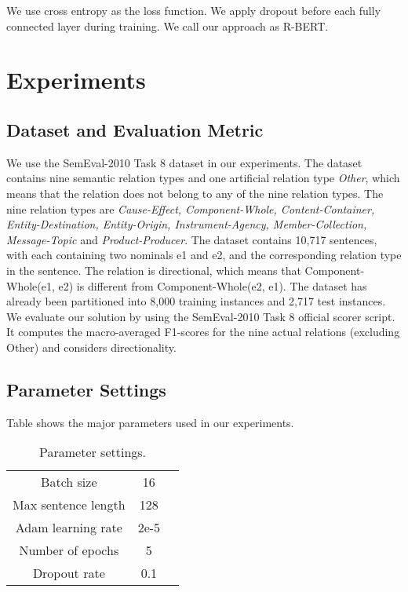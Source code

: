 \documentclass[11pt]{article}
\begin{document}
We use cross entropy as the loss function. We apply dropout
before each fully connected layer during training. We call our approach as R-BERT. 
\section{Experiments } \label{sec:exp}

\subsection{Dataset and Evaluation Metric} \label{sec:dataset}

We use the SemEval-2010 Task 8 dataset in our experiments. 
The dataset contains nine semantic relation types and one
artificial relation type \textit{Other}, which means that the
relation does not belong to any of the nine relation types.
The nine relation types are 
\textit{Cause-Effect,
Component-Whole, Content-Container, Entity-Destination, Entity-Origin, Instrument-Agency,
Member-Collection, Message-Topic} and \textit{Product-Producer}.
The dataset contains
10,717 sentences, with each containing two nominals e1 and e2,
and the corresponding relation type in the sentence. The relation is
directional, which means that Component-Whole(e1, e2) is 
different from Component-Whole(e2, e1). 
The dataset has already been
partitioned into 8,000 training instances and 2,717
test instances. We evaluate our solution by using the
SemEval-2010 Task 8 official scorer script. It computes
the macro-averaged F1-scores for the nine
actual relations (excluding Other) and considers directionality.


\subsection{Parameter Settings}

Table  shows the major parameters used in our experiments.

\begin{table}[H]
	\caption{Parameter settings.} \label{tab:para}
	\begin{center}
		\begin{tabular}{ |c|c|c| } 
			\hline
			Batch size   & 16  \\ 
    		Max sentence length & 128 \\
			Adam learning rate  & 2e-5 \\
    		Number of epochs & 5\\ 
			Dropout rate  & 0.1 \\
			\hline
		\end{tabular}
	\end{center}
\end{table}
\end{document}
